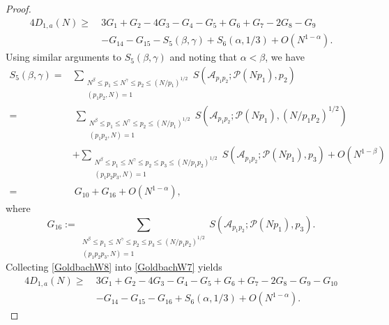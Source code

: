 \documentclass[12pt, a4paper]{amsart}
\def\leq{\leqslant}
\def\le{\leqslant}
\def\ge{\geqslant}
\theoremstyle{plain}
\theoremstyle{remark}
\numberwithin{equation}{section}
\begin{document}
\begin{proof}
\begin{equation}
\begin{split}
4D_{1,a}(N)\ge\ & 3G_1+G_2-4G_3-G_4-G_5+G_6+G_7-2G_8-G_9\\
&-G_{14}-G_{15}-S_5(\beta,\gamma)+S_6(\alpha,1/3)+O(N^{1-\alpha}).
\end{split}
\end{equation}
Using similar arguments to $S_5(\beta,\gamma)$ and noting that $\alpha<\beta$, we have 
\begin{equation}\label{GoldbachW8}
\begin{split}
S_5(\beta,\gamma)=&\sum_{\substack{N^\beta \le p_1 \le N^\gamma \le p_2 \le (N/p_1)^{1/2} \\ (p_1 p_2, N) = 1}}  
S(\mathscr{A}_{p_1 p_2}; \mathscr{P}(N p_1), p_2)\\
=&\ \sum_{\substack{N^{\beta} \leq p_1 \le N^{\gamma} 
\leq p_2 \le (N/p_1)^{1/2} \\ (p_1 p_2, N) = 1}} S(\mathscr{A}_{p_1 p_2}; \mathscr{P}(N p_1), (N/p_1 p_2)^{1/2})\\
&+\sum_{\substack{N^{\beta} \leq p_1 \le N^{\gamma} \leq p_2 \le p_3\le (N/p_1p_2)^{1/2} \\ (p_1 p_2 p_3, N) = 1}} S(\mathscr{A}_{p_1 p_2}; \mathscr{P}(N p_1), p_3)+O(N^{1-\beta})\\
=&\ G_{10}+G_{16}+O(N^{1-\alpha}),
\end{split}
\end{equation}
where 
\begin{equation}\label{def/G16}
G_{16}:=\sum_{\substack{N^{\beta} \leq p_1 \le N^{\gamma} \leq p_2 \le p_3\le (N/p_1p_2)^{1/2} \\ (p_1 p_2 p_3, N) = 1}} S(\mathscr{A}_{p_1 p_2}; \mathscr{P}(N p_1), p_3). 
		\end{equation}
Collecting \eqref{GoldbachW8} into \eqref{GoldbachW7} yields 
\begin{equation}\label{GoldbachW9}
\begin{split}
		4D_{1,a}(N)\ge\ & 3G_1+G_2-4G_3-G_4-G_5+G_6+G_7-2G_8-G_9-G_{10}\\
		&-G_{14}-G_{15}-G_{16}+S_6(\alpha,1/3)+O(N^{1-\alpha}).
\end{split}
\end{equation}


\end{proof}
\end{document}
